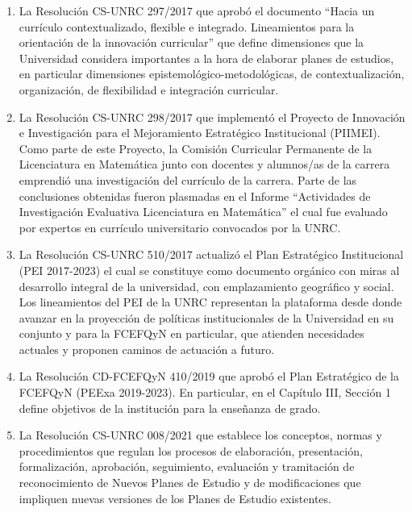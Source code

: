 \documentclass[a4paper, 12pt]{article}
\begin{document}
\begin{enumerate}
 \item La Resolución CS-UNRC 297/2017 que aprobó el documento ``Hacia   un   currículo contextualizado, flexible e integrado. Lineamientos para la orientación de la innovación  curricular'' que define dimensiones que la Universidad considera importantes a la hora de elaborar planes de estudios, en particular dimensiones epistemológico-metodológicas, de contextualización, organización, de flexibilidad e integración curricular. 

 \item La Resolución CS-UNRC 298/2017  que implementó  el Proyecto de Innovación e Investigación para el Mejoramiento Estratégico Institucional (PIIMEI). Como parte de este Proyecto, la Comisión Curricular Permanente de la Licenciatura en Matemática junto con docentes y alumnos/as de la carrera emprendió una investigación del currículo de la carrera.  Parte de las conclusiones obtenidas fueron plasmadas  en el Informe ``Actividades de Investigación Evaluativa
Licenciatura en Matemática'' el cual fue evaluado por expertos en currículo universitario  convocados por la UNRC.

\item La Resolución CS-UNRC 510/2017  actualizó el Plan Estratégico Institucional (PEI 2017-2023) el cual se constituye como documento orgánico con miras al desarrollo integral de la universidad, con emplazamiento geográfico y social. Los lineamientos del PEI de la UNRC representan la plataforma desde donde avanzar en la proyección de políticas institucionales de la Universidad en su conjunto y para la FCEFQyN en particular, que atienden necesidades actuales y proponen caminos de actuación a futuro.

\item La Resolución CD-FCEFQyN 410/2019 que aprobó  el Plan Estratégico de la FCEFQyN (PEExa 2019-2023). En particular, en el Capítulo III, Sección 1 define objetivos de la institución para la enseñanza de grado.   

 \item La Resolución CS-UNRC 008/2021 que establece los conceptos, normas y procedimientos que regulan los procesos de elaboración, presentación, formalización, aprobación, seguimiento, evaluación y tramitación de reconocimiento de Nuevos Planes de Estudio y de modificaciones que impliquen nuevas versiones de los Planes de Estudio existentes.

\end{enumerate}
\end{document}

